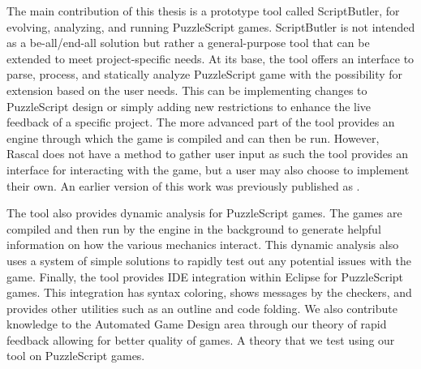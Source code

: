 The main contribution of this thesis is a prototype tool called ScriptButler, for evolving, analyzing, and running PuzzleScript games. ScriptButler is not intended as a be-all/end-all solution but rather a general-purpose tool that can be extended to meet project-specific needs. At its base, the tool offers an interface to parse, process, and statically analyze PuzzleScript game with the possibility for extension based on the user needs. This can be implementing changes to PuzzleScript design or simply adding new restrictions to enhance the live feedback of a specific project. The more advanced part of the tool provides an engine through which the game is compiled and can then be run. However, Rascal does not have a method to gather user input as such the tool provides an interface for interacting with the game, but a user may also choose to implement their own. An earlier version of this work was previously published as .

The tool also provides dynamic analysis for PuzzleScript games. The games are compiled and then run by the engine in the background to generate helpful information on how the various mechanics interact. This dynamic analysis also uses a system of simple solutions to rapidly test out any potential issues with the game. Finally, the tool provides IDE integration within Eclipse for PuzzleScript games. This integration has syntax coloring, shows messages by the checkers, and provides other utilities such as an outline and code folding. We also contribute knowledge to the Automated Game Design area through our theory of rapid feedback allowing for better quality of games. A theory that we test using our tool on PuzzleScript games.




